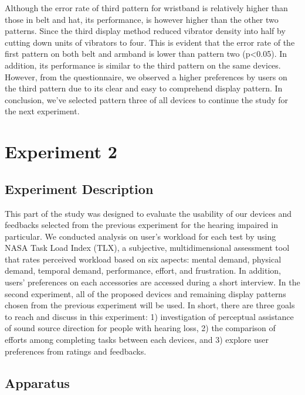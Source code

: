 \documentclass{sigchi}
\begin{document}
Although the error rate of third pattern for wristband is relatively higher than those in belt and hat, its performance, is however higher than the other two patterns. Since the third display method reduced vibrator density into half by cutting down units of vibrators to four. This is evident that the error rate of the first pattern on both belt and armband is lower than pattern two (p\textless0.05). In addition, its performance is similar to the third pattern on the same devices. However, from the questionnaire, we observed a higher preferences by users on the third pattern due to its clear and easy to comprehend display pattern. In conclusion, we've selected pattern three of all devices to continue the study for the next experiment.

\section{Experiment 2}
\subsection{Experiment Description}
This part of the study was designed to evaluate the usability of our devices and feedbacks selected from the previous experiment for the hearing impaired in particular. We conducted analysis on user's workload for each test by using NASA Task Load Index (TLX), a subjective, multidimensional assessment tool that rates perceived workload based on six aspects: mental demand, physical demand, temporal demand, performance, effort, and frustration. In addition, users’ preferences on each accessories are accessed during a short interview. In the second experiment, all of the proposed devices and remaining display patterns chosen from the previous experiment will be used. In short, there are three goals to reach and discuss in this experiment: 1) investigation of perceptual assistance of sound source direction for people with hearing loss, 2) the comparison of efforts among completing tasks between each devices, and 3) explore user preferences from ratings and feedbacks.

\subsection{Apparatus}
\end{document}

